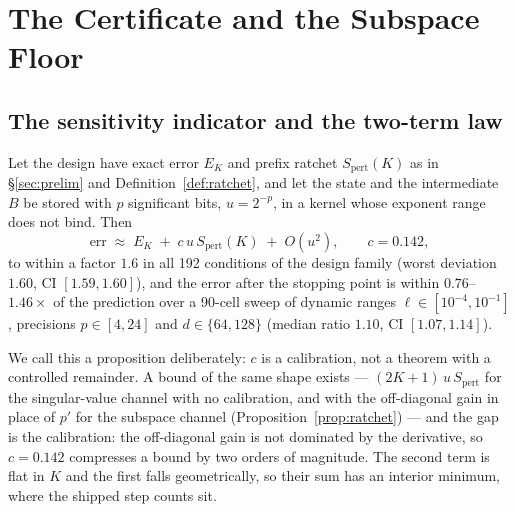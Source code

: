 \section{The Certificate and the Subspace Floor}
\label{sec:cert}

\subsection{The sensitivity indicator and the two-term law}
\label{sec:thmcert}

\begin{proposition}
\label{thm:cert}
Let the design have exact error $E_K$ and prefix ratchet $S_{\mathrm{pert}}(K)$ as
in \S\ref{sec:prelim} and Definition~\ref{def:ratchet}, and let the state and the
intermediate $B$ be stored with $p$ significant bits, $u = 2^{-p}$, in a kernel whose
exponent range does not bind.  Then
\begin{equation}
\mathrm{err} \;\approx\; E_K \;+\; c\,u\,S_{\mathrm{pert}}(K) \;+\; O(u^2),
\qquad c = 0.142,
\label{eq:cert}
\end{equation}
to within a factor $1.6$ in all 192 conditions of the design family (worst deviation
$1.60$, CI $[1.59,1.60]$), and the error after the stopping point is within
$0.76$--$1.46\times$ of the prediction over a 90-cell sweep of dynamic ranges
$\ell\in[10^{-4},10^{-1}]$, precisions $p\in[4,24]$ and $d\in\{64,128\}$ (median ratio
$1.10$, CI $[1.07,1.14]$).
\end{proposition}

We call this a proposition deliberately: $c$ is a calibration, not a theorem with a
controlled remainder.  A bound of the same shape exists --- $(2K+1)\,u\,S_{\mathrm{pert}}$
for the singular-value channel with no calibration, and with the off-diagonal gain in place
of $p'$ for the subspace channel (Proposition~\ref{prop:ratchet}) --- and the gap is the
calibration: the off-diagonal gain is not dominated by the derivative, so $c=0.142$
compresses a bound by two orders of magnitude.  The second term is flat in $K$ and the
first falls geometrically, so their sum has an interior minimum, where the shipped step
counts sit.

